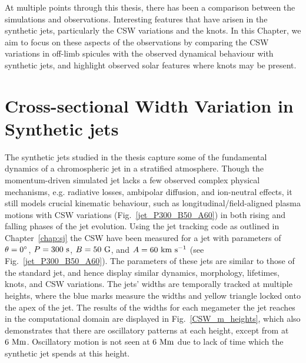 %
At multiple points through this thesis, there has been a comparison between the simulations and observations. Interesting features that have arisen in the synthetic jets, particularly the CSW variations and the knots. In this Chapter, we aim to focus on these aspects of the observations by comparing the CSW variations in off-limb spicules with the observed dynamical behaviour with synthetic jets, and highlight observed solar features where knots may be present.
\section{Cross-sectional Width Variation in Synthetic jets}
\label{sec:CSW_syn_jet}
The synthetic jets studied in the thesis capture some of the fundamental dynamics of a chromospheric jet in a stratified atmosphere. Though the momentum-driven simulated jet lacks a few observed complex physical mechanisms, e.g. radiative losses, ambipolar diffusion, and ion-neutral effects, it still models crucial kinematic behaviour, such as longitudinal/field-aligned plasma motions with CSW variations (Fig.~\ref{jet_P300_B50_A60}) in both rising and falling phases of the jet evolution. \np
%
Using the jet tracking code as outlined in Chapter~\ref{chap:sj} the CSW have been measured for a jet with parameters of $\theta =0^{\circ}$, $P=300~\rm{s}$, $B=50~\rm{G}$, and $A=60~\rm{km ~s^{-1}}$ (see Fig.~\ref{jet_P300_B50_A60}). The parameters of these jets are similar to those of the standard jet, and hence display similar dynamics, morphology, lifetimes, knots, and CSW variations. The jets' widths are temporally tracked at multiple heights, where the blue marks measure the widths and yellow triangle locked onto the apex of the jet. The results of the widths for each megameter the jet reaches in the computational domain are displayed in Fig.~\ref{CSW_m_heights}, which also demonstrates that there are oscillatory patterns at each height, except from at $6~\rm{Mm}$. Oscillatory motion is not seen at $6~\rm{Mm}$ due to lack of time which the synthetic jet spends at this height. \np
%
